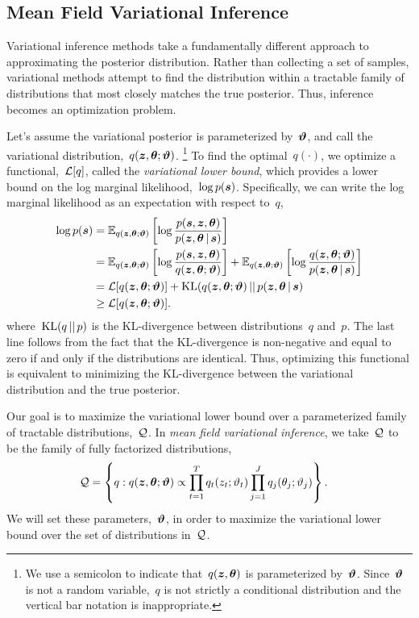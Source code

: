 \subsection{Mean Field Variational Inference}
Variational inference methods \citep{jordan1999introduction,
  wainwright2008graphical} take a fundamentally different approach to
approximating the posterior distribution. Rather than collecting a set
of samples, variational methods attempt to find the distribution
within a tractable family of distributions that most closely matches
the true posterior. Thus, inference becomes an optimization problem.

Let's assume the variational posterior is parameterized by~$\boldsymbol{\vartheta}$,
and call the variational distribution,~$q(\boldsymbol{z}, \boldsymbol{\theta} ; \boldsymbol{\vartheta})$.
\footnote{We use a semicolon to indicate that~$q(\boldsymbol{z}, \boldsymbol{\theta})$ is
  parameterized by~$\boldsymbol{\vartheta}$.  Since~$\boldsymbol{\vartheta}$ is not a random
  variable,~$q$ is not strictly a conditional distribution and the
  vertical bar notation is inappropriate.}  To find the
optimal~$q(\cdot)$, we optimize a functional,~$\mathcal{L}[q]$, called the
\emph{variational lower bound}, which provides a lower bound on the
log marginal likelihood,~${\log p(\boldsymbol{s})}$.  Specifically, we can write
the log marginal likelihood as an expectation with respect to~$q$,
\begin{align*}
  \log p(\boldsymbol{s}) 
  &= \mathbb{E}_{q(\boldsymbol{z}, \boldsymbol{\theta} ; \boldsymbol{\vartheta})} \left[ \log \frac{p(\boldsymbol{s}, \boldsymbol{z}, \boldsymbol{\theta})}{p(\boldsymbol{z}, \boldsymbol{\theta} \,|\, \boldsymbol{s})} \right] \\
  &= \mathbb{E}_{q(\boldsymbol{z}, \boldsymbol{\theta} ; \boldsymbol{\vartheta})} \left[ \log \frac{p(\boldsymbol{s}, \boldsymbol{z}, \boldsymbol{\theta})}{q(\boldsymbol{z}, \boldsymbol{\theta}; \boldsymbol{\vartheta})} \right]
   + \mathbb{E}_{q(\boldsymbol{z}, \boldsymbol{\theta}; \boldsymbol{\vartheta})} \left[ \log \frac{q(\boldsymbol{z}, \boldsymbol{\theta}; \boldsymbol{\vartheta})}{p(\boldsymbol{z}, \boldsymbol{\theta} \,|\, \boldsymbol{s})} \right] \\
  &= \mathcal{L}[q(\boldsymbol{z}, \boldsymbol{\theta}; \boldsymbol{\vartheta})] + \mathrm{KL}(q(\boldsymbol{z}, \boldsymbol{\theta}; \boldsymbol{\vartheta}) {\,||\,} p(\boldsymbol{z}, \boldsymbol{\theta} \,|\, \boldsymbol{s}) \\
  &\geq \mathcal{L}[q(\boldsymbol{z}, \boldsymbol{\theta}; \boldsymbol{\vartheta})].
\end{align*}
where~$\mathrm{KL}(q {\,||\,} p)$ is the KL-divergence between distributions~$q$ and~$p$. 
The last line follows from the fact that the KL-divergence is non-negative
and equal to zero if and only if the distributions are identical. Thus, 
optimizing this functional is equivalent to minimizing the KL-divergence
between the variational distribution and the true posterior.

Our goal is to maximize the variational lower bound over a
parameterized family of tractable distributions,~$\mathcal{Q}$. In \emph{mean field
variational inference}, we take~$\mathcal{Q}$ to be the family of fully
factorized distributions,
\begin{align*}
  \mathcal{Q} &= \left \{ q: q(\boldsymbol{z}, \boldsymbol{\theta}; \boldsymbol{\vartheta}) \propto \prod_{t=1}^T q_t(z_t; \vartheta_t) \prod_{j=1}^J q_j(\theta_j; \vartheta_j) \right\}.
\end{align*}
We will set these parameters,~$\boldsymbol{\vartheta}$, in order to maximize the
variational lower bound over the set of distributions in~$\mathcal{Q}$.

